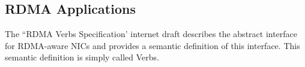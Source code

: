 








\subsection{RDMA Applications}

The ``RDMA Verbs Specification' internet draft describes the abstract
interface for RDMA-aware NICs and provides a semantic definition of this
interface. This semantic definition is simply called Verbs\cite{hillandRDMAProtocolVerbs}.

